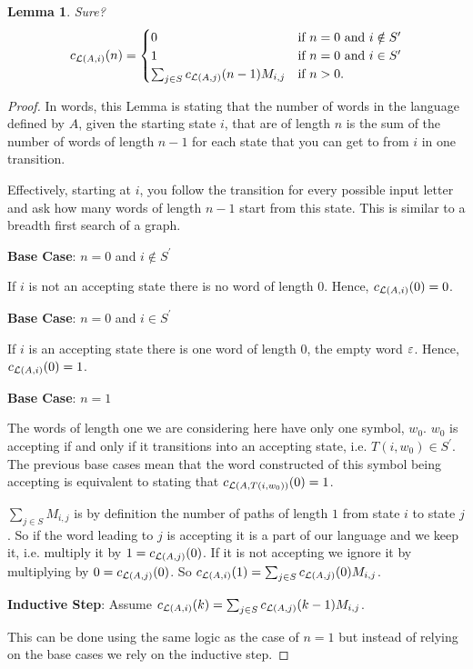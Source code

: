 \documentclass[a4paper]{article}
\newtheorem{lemma}{Lemma}[section]
\theoremstyle{definition}
\theoremstyle{definition}
\theoremstyle{definition}
\begin{document}
\begin{lemma} Sure?
    \[
    c_{\mathcal{L}(A, i)}(n) = \begin{cases}
        0 & \text{if } n = 0 \text{ and } i \notin S^\prime \\
        1 & \text{if } n = 0 \text{ and } i \in S^\prime \\
        \sum_{j \in S} c_{\mathcal{L}(A, j)}(n - 1) M_{i,j} & \text{if } n > 0.
    \end{cases}
    \]
\end{lemma}
\begin{proof}
    In words, this Lemma is stating that the number of words in the language defined by \(A\), given the starting state \(i\), that are of length \(n\) is the sum of the number of words of length \(n - 1\) for each state that you can get to from \(i\) in one transition.

    Effectively, starting at \(i\), you follow the transition for every possible input letter and ask how many words of length \(n - 1\) start from this state. This is similar to a breadth first search of a graph.


    \noindent \textbf{Base Case}: \(n = 0\) and \(i \notin S^\prime\)

    If \(i\) is not an accepting state there is no word of length \(0\). Hence, \(c_{\mathcal{L}(A, i)}(0) = 0\).

    \noindent \textbf{Base Case}: \(n = 0\) and \(i \in S^\prime\)

    If \(i\) is an accepting state there is one word of length \(0\), the empty word \(\varepsilon\). Hence, \(c_{\mathcal{L}(A, i)}(0) = 1\).

    \noindent \textbf{Base Case}: \(n = 1\)

    The words of length one we are considering here have only one symbol, \(w_0\). \(w_0\) is accepting if and only if it transitions into an accepting state, i.e. \(T(i, w_0) \in S^\prime\). The previous base cases mean that the word constructed of this symbol being accepting is equivalent to stating that \(c_{\mathcal{L}(A, T(i, w_0))}(0) = 1\).
    
    \(\sum_{j \in S} M_{i,j}\) is by definition the number of paths of length \(1\) from state \(i\) to state \(j\). So if the word leading to \(j\) is accepting it is a part of our language and we keep it, i.e. multiply it by \(1 = c_{\mathcal{L}(A, j)}(0)\). If it is not accepting we ignore it by multiplying by \(0 = c_{\mathcal{L}(A, j)}(0)\). So \(c_{\mathcal{L}(A, i)}(1) = \sum_{j \in S} c_{\mathcal{L}(A, j)}(0) M_{i,j}\).

    \noindent \textbf{Inductive Step}: Assume \( c_{\mathcal{L}(A, i)}(k) = \sum_{j \in S} c_{\mathcal{L}(A, j)}(k - 1) M_{i,j} \).

    This can be done using the same logic as the case of \(n = 1\) but instead of relying on the base cases we rely on the inductive step.
    
\end{proof}
\end{document}
